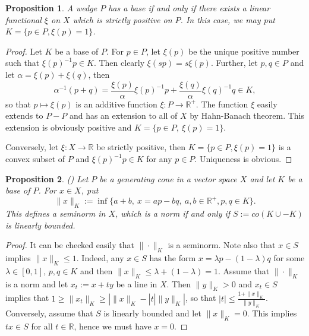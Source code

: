 \documentclass[12pt]{article}
\newtheorem{prop}{Proposition}
\theoremstyle{remark}
\newcommand{\<}{\langle}
\begin{document}
\begin{prop} A wedge  $P$ has a base if and only if there exists a linear functional $\xi$ on $X$ which is strictly positive on $P$. In this case, we may put 
 $K=\{p\in P, \xi(p)=1\}$. 
\end{prop}

\begin{proof}  Let $K$ be a base of $P$. For $p\in P$, let $\xi(p)$ be the unique positive number such that 
$\xi(p)^{-1}p\in K$. Then clearly $\xi(sp)=s\xi(p)$. Further, let $p,q\in P$ and let $\alpha=\xi(p)+\xi(q)$, then 
\[
\alpha^{-1}(p+q)=\frac{\xi(p)}{\alpha} \xi(p)^{-1}p+ \frac{\xi(q)}{\alpha} \xi(q)^{-1}q\in K,
\]
so that  $p\mapsto \xi(p)$ is an additive function  $\xi: P\to \mathbb R^+$. The function $\xi$ easily extends to $P-P$ and has an extension to all of $X$ by Hahn-Banach theorem. This extension is obviously positive and $K=\{p\in P,\ \xi(p)=1\}$.  

Conversely, let $\xi:X\to \mathbb R$ be strictly positive, then $K=\{p\in P, \xi(p)=1\}$ is a convex subset of $P$ and $\xi(p)^{-1}p\in K$ for any $p\in P$. Uniqueness is obvious. 



\end{proof}



\begin{prop} (\cite{ellis}) Let $P$ be a generating cone in a vector space $X$ and let $K$ be a base of $P$. For $x\in X$, put 
\[
\|x\|_K:=\inf\{a+b,\ x=a p-b q,\ a,b\in \mathbb R^+, p,q\in K\}.
\]
This defines a seminorm in $X$, which is a norm if and only if $S:=co(K\cup -K)$ is linearly bounded. 

\end{prop}

\begin{proof}
It can be checked easily that $\|\cdot\|_K$ is a seminorm. Note also that $x\in S$ implies $\|x\|_K\le 1$. Indeed, any $x\in S$ has the form $x=\lambda p-(1-\lambda)q$ for some  $\lambda\in [0,1]$, $p,q\in K$ and then  $\|x\|_K\le \lambda+(1-\lambda)=1$.  
Assume that $\|\cdot\|_K$ is a norm and let $x_t:=x+ty$ be a line in $X$. Then $\|y\|_K>0$ and $x_t\in  S$ implies that $1\ge \|x_t\|_K\ge |\|x\|_K-|t|\|y\|_K|$, so that $|t|\le \tfrac{1+\|x\|_K}{\|y\|_K}$. Conversely, assume that $S$ is linearly bounded and let $\|x\|_K=0$. This implies $tx\in S$ for all $t\in \mathbb R$, hence we must have 
$x=0$. 
 

\end{proof}
\end{document}
